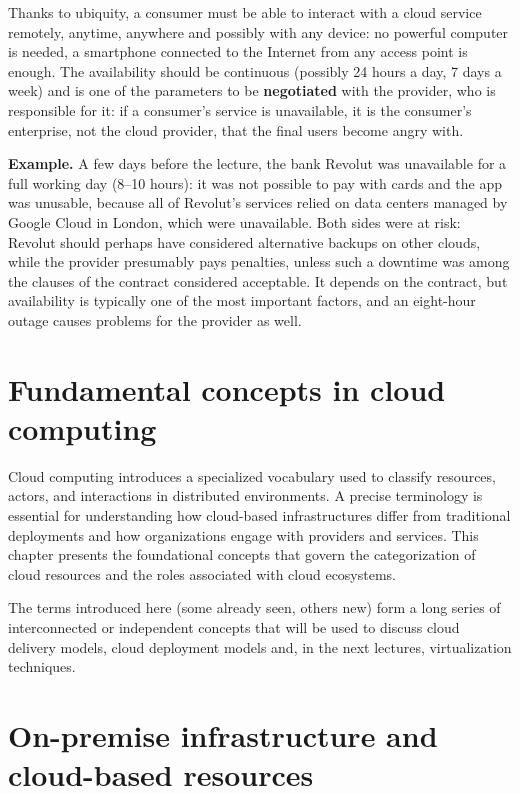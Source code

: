 \documentclass[11pt,a4paper,openany]{report}
\begin{document}
Thanks to ubiquity, a consumer must be able to interact with a cloud service remotely, anytime, anywhere and possibly with any device: no powerful computer is needed, a smartphone connected to the Internet from any access point is enough. The availability should be continuous (possibly 24 hours a day, 7 days a week) and is one of the parameters to be \textbf{negotiated} with the provider, who is responsible for it: if a consumer's service is unavailable, it is the consumer's enterprise, not the cloud provider, that the final users become angry with.

\textbf{Example.} A few days before the lecture, the bank Revolut was unavailable for a full working day (8--10 hours): it was not possible to pay with cards and the app was unusable, because all of Revolut's services relied on data centers managed by Google Cloud in London, which were unavailable. Both sides were at risk: Revolut should perhaps have considered alternative backups on other clouds, while the provider presumably pays penalties, unless such a downtime was among the clauses of the contract considered acceptable. It depends on the contract, but availability is typically one of the most important factors, and an eight-hour outage causes problems for the provider as well.

\section{Fundamental concepts in cloud computing}

Cloud computing introduces a specialized vocabulary used to classify resources, actors, and interactions in distributed environments. A precise terminology is essential for understanding how cloud-based infrastructures differ from traditional deployments and how organizations engage with providers and services. This chapter presents the foundational concepts that govern the categorization of cloud resources and the roles associated with cloud ecosystems.

The terms introduced here (some already seen, others new) form a long series of interconnected or independent concepts that will be used to discuss cloud delivery models, cloud deployment models and, in the next lectures, virtualization techniques.

\section{On-premise infrastructure and cloud-based resources}
\end{document}
